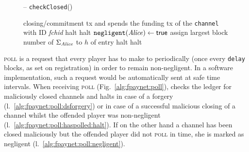 \begin{figure}[H]
\begin{systembox}{\fpaynet{} -- \texttt{checkClosed}()}
\begin{algorithmic}[1]
{            closing/commitment tx and spends the funding tx of the
            \texttt{channel} with ID \textit{fchid}}
            \label{alg:fpaynet:close:func:ifdsforgery}
              \State halt 
              \label{alg:fpaynet:close:func:dsforgery}
              \label{alg:fpaynet:close:func:ifmalicious}
                \State halt
                \label{alg:fpaynet:close:func:malicious}
              \Else
                \State $\mathtt{negligent}(\mathit{Alice}) \gets \mathsf{true}$
              \EndIf
              \State assign largest block number of $\Sigma_{\mathit{Alice}}$ to $h$ of
              entry
            \label{alg:fpaynet:close:func:ifidle}
              \State halt
              \label{alg:fpaynet:close:func:idle}
            \EndIf
          \EndFor
              \State halt
              \label{alg:fpaynet:close:func:balance}
            \EndIf
          \EndIf
        \EndFunction
        \label{alg:fpaynet:close:func:end}
      \end{algorithmic}
    \end{systembox}
    \caption{}
    \label{alg:fpaynet:close:func}
  \end{figure}

  \textsc{poll} is a request that every player has to make to \fpaynet{}
  periodically (once every \texttt{delay} blocks, as set on registration) in
  order to remain non-negligent. In a software implementation, such a request
  would be automatically sent at safe time intervals. When receiving
  \textsc{poll} (Fig.~\ref{alg:fpaynet:poll}), \fpaynet{} checks the ledger for
  maliciously closed channels and halts in case of a forgery
  (l.~\ref{alg:fpaynet:poll:dsforgery}) or in case of a successful malicious
  closing of a channel whilst the offended player was non-negligent
  (l.~\ref{alg:fpaynet:poll:haspolled:halt}). If on the other hand a channel has
  been closed maliciously but the offended player did not \textsc{poll} in time,
  she is marked as negligent (l.~\ref{alg:fpaynet:poll:negligent}).

